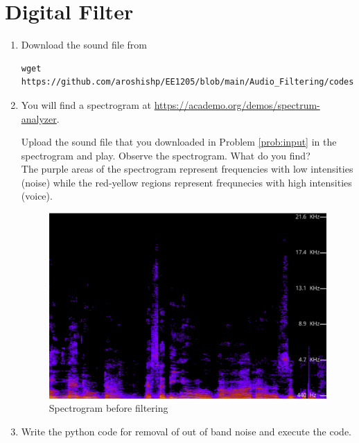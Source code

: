 \documentclass[journal,12pt,twocolumn]{IEEEtran}
\theoremstyle{remark}
\renewcommand\thesection{\arabic{section}}
\numberwithin{equation}{subsection}
\begin{document}
\section{Digital Filter}
\begin{enumerate}[label=\thesection.\arabic*
,ref=\thesection.\theenumi]
\item
\label{prob:input}
Download the sound file from  
\begin{lstlisting}
wget https://github.com/aroshishp/EE1205/blob/main/Audio_Filtering/codes/2.wav
\end{lstlisting}

\item
\label{prob:spectrogram}
You will find a spectrogram at \href{https://academo.org/demos/spectrum-analyzer}{\url{https://academo.org/demos/spectrum-analyzer}}. 

Upload the sound file that you downloaded in Problem \ref{prob:input} in the spectrogram  and play.  Observe the spectrogram. What do you find?
\\

\solution The purple areas of the spectrogram represent frequencies with low intensities (noise) while the red-yellow regions represent frequnecies with high intensities (voice). 

\begin{figure}[!h]
    \centering
    \includegraphics[width = \columnwidth]{figs/unfiltered.png}
    \caption{Spectrogram before filtering}
    \label{fig:2.2}
\end{figure}

\item
\label{prob:output}
Write the python code for removal of out of band noise and execute the code.
\\


\end{enumerate}
\end{document}
